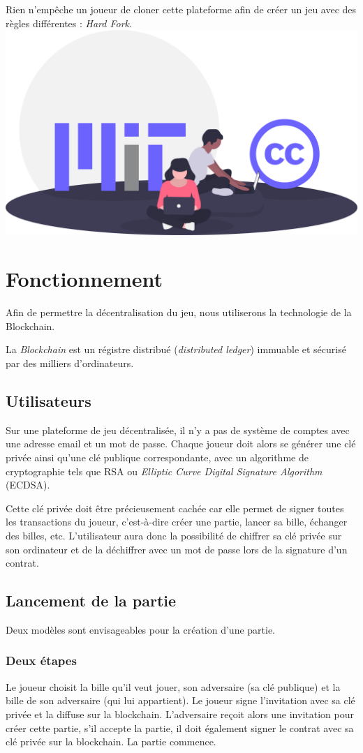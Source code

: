 \documentclass{article}
\begin{document}
Rien n'empêche un joueur de cloner cette plateforme afin de créer un jeu avec des règles différentes : \textit{Hard Fork}.\\

\includegraphics[width=0.3\linewidth]{assets/open.png}\\

\section{Fonctionnement}
Afin de permettre la décentralisation du jeu, nous utiliserons la technologie de la Blockchain.

La \textit{Blockchain} est un régistre distribué (\textit{distributed ledger}) immuable et sécurisé par des milliers d'ordinateurs.

\subsection{Utilisateurs}
Sur une plateforme de jeu décentralisée, il n'y a pas de système de comptes avec une adresse email et un mot de passe.
Chaque joueur doit alors se générer une clé privée ainsi qu'une clé publique correspondante, avec un algorithme de cryptographie tels que RSA ou \textit{Elliptic Curve Digital Signature Algorithm} (ECDSA).

Cette clé privée doit être précieusement cachée car elle permet de signer toutes les transactions du joueur, c'est-à-dire créer une partie, lancer sa bille, échanger des billes, etc. L'utilisateur aura donc la possibilité de chiffrer sa clé privée sur son ordinateur et de la déchiffrer avec un mot de passe lors de la signature d'un contrat. 

\subsection{Lancement de la partie}
Deux modèles sont envisageables pour la création d'une partie.
\subsubsection{Deux étapes}
Le joueur choisit la bille qu'il veut jouer, son adversaire (sa clé publique) et la bille de son adversaire (qui lui appartient). Le joueur signe l'invitation avec sa clé privée et la diffuse sur la blockchain. L'adversaire reçoit alors une invitation pour créer cette partie, s'il accepte la partie, il doit également signer le contrat avec sa clé privée sur la blockchain. La partie commence.
\end{document}
